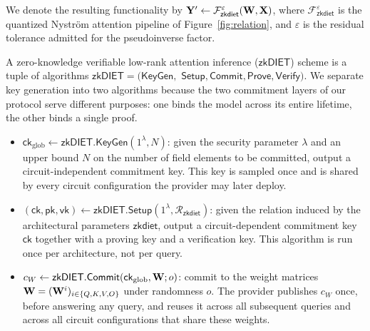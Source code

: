 \documentclass[runningheads]{llncs}
\begin{document}
We denote the resulting functionality by ${\mathbf{Y}}' \leftarrow \mathcal{F}^{\varepsilon}_{\mathsf{zkdiet}}({\mathbf{W}}, {\mathbf{X}})$, where $\mathcal{F}^{\varepsilon}_{\mathsf{zkdiet}}$ is the quantized Nystr\"om attention pipeline of Figure~\ref{fig:relation}, and $\varepsilon$ is the residual tolerance admitted for the pseudoinverse factor.

A zero-knowledge verifiable low-rank attention inference ($\mathsf{zkDIET}$) scheme is a tuple of algorithms $\mathsf{zkDIET} = (\mathsf{KeyGen},$ $\mathsf{Setup}, \mathsf{Commit}, \mathsf{Prove}, \mathsf{Verify})$. We separate key generation into two algorithms because the two commitment layers of our protocol serve different purposes: one binds the model across its entire lifetime, the other binds a single proof.

\begin{itemize} [leftmargin=3mm, itemsep=2pt, topsep=2pt]
  \item $\mathsf{ck}_{\mathrm{glob}} \leftarrow \mathsf{zkDIET}.\mathsf{KeyGen}(1^{\lambda}, N)$:
        given the security parameter $\lambda$ and an upper bound $N$ on the number of field elements to be committed, output a circuit-independent commitment key. This key is sampled once and is shared by every circuit configuration the provider may later deploy.

  \item $(\mathsf{ck}, \mathsf{pk}, \mathsf{vk}) \leftarrow
        \mathsf{zkDIET}.\mathsf{Setup}(1^{\lambda}, \mathcal{R}_{\mathsf{zkdiet}})$:
        given the relation induced by the architectural parameters $\mathsf{zkdiet}$, output a circuit-dependent commitment key $\mathsf{ck}$ together with a proving key and a verification key. This algorithm is run once per architecture, not per query.

  \item $c_{W} \leftarrow
        \mathsf{zkDIET}.\mathsf{Commit}(\mathsf{ck}_{\mathrm{glob}}, {\mathbf{W}}; o)$:
        commit to the weight matrices ${\mathbf{W}} = ({\mathbf{W}}^{i})_{i \in \{Q,K,V,O\}}$ under randomness $o$. The provider publishes $c_{W}$ once, before answering any query, and reuses it across all subsequent queries and across all circuit configurations that share these weights.


\end{itemize}
\end{document}
